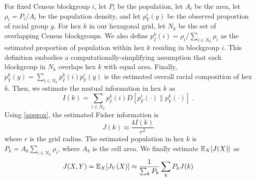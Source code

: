 	For fixed Census blockgroup $i$, let $P_i$ be the population, let $A_i$ be the area, let $\rho_i = P_i / A_i$ be the population density, and let $p^i_Y(y)$ be the observed proportion of racial group $y$. For hex $k$ in our hexagonal grid, let $N_k$ be the set of overlapping Census blockgroups. We also define $p^{k}_I(i) = \rho_i / \sum_{i \in N_k} \rho_i$ as the estimated proportion of population within hex $k$ residing in blockgroup $i$. This definition embodies a computationally-simplifying assumption that each blockgroup in $N_k$ overlaps hex $k$ with equal area. Finally, $p^k_Y(y) = \sum_{i \in N_k} p^{k}_I(i) p^i_Y(y)$ is the estimated overall racial composition of hex $k$. Then, we estimate the mutual information in hex $k$ as 
	\begin{equation}
		I(k) = \sum_{i \in N_k} p^k_I(i) D[p^i_Y(\cdot) \| p^k_Y(\cdot)]\;. 
	\end{equation}
	Using \eqref{approx}, the estimated Fisher information is 
	\begin{equation}
		J(k) \approx \frac{4 I(k)}{r^2}
	\end{equation}
	where $r$ is the grid radius. The estimated population in hex $k$ is $P_k = A_k\sum_{i \in N_k} \rho_i$, where $A_k$ is the cell area. We finally estimate $\mathbb{E}_X[J(X)]$ as 
	\begin{equation}
		J(X,Y) = \mathbb{E}_X[J_Y(X)] \approx \frac{1}{\sum_k P_k} \sum_k P_k J(k)
	\end{equation}

